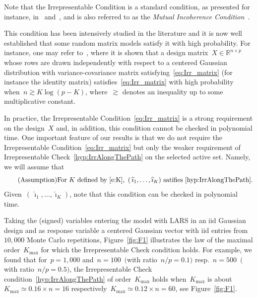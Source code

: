 \documentclass[final,numbib]{imaiai}%
\numberwithin{equation}{section}
\def\bbR{\mathds{R}}
\renewcommand{\hat}{\widehat}
\newcommand{\<}{\langle}
\renewcommand{\>}{\rangle}
\newcommand{\1}{\mathds{1}}
\begin{document}
{\begin{remark}
Note that the Irrepresentable Condition is a standard condition, as presented for instance, in~\cite[Page 53]{van2016estimation} and~\cite[Sec.~7.5.1]{Buhlmann_vandeGeer11}, and is also referred to as the {\it Mutual Incoherence Condition}~\citep{wainwright2009sharp}.
\end{remark}

\begin{remark}
This condition has been intensively studied in the literature and it is now well established that some random matrix models satisfy it with high probability.
For instance, one may refer to~\cite{wainwright2009sharp}, where it is shown that a design matrix~$X\in\bbR^{n\times p}$ whose rows are drawn independently with respect to a centered Gaussian distribution with variance-covariance matrix satisfying~\eqref{eq:Irr_matrix} (for instance the identity matrix) satisfies~\eqref{eq:Irr_matrix} with high probability when~$n\gtrsim K\log(p-K)$, where~$ \gtrsim$ denotes an inequality up to some multiplicative constant.
\end{remark}

In practice, the Irrepresentable Condition~\eqref{eq:Irr_matrix} is a strong requirement on the design~$X$ and, in addition, this condition cannot be checked in polynomial time.
One important feature of our results is that we do not require the Irrepresentable Condition~\eqref{eq:Irr_matrix} but only the weaker requirement of Irrepresentable Check~\eqref{hyp:IrrAlongThePath} on the selected active set.
Namely, we will assume that
\[
\tag{Assumption}
\text{For } K \text{ defined by }\eqref{e:K},\text{ }
(\,\hat \imath_1,\ldots,  \hat \imath_K)\text{ satifies }\eqref{hyp:IrrAlongThePath}.
\]
Given~$(\,\hat \imath_1,\ldots,  \hat \imath_K)$, note that this condition can be checked in polynomial time.

\begin{example}
Taking the (signed) variables entering the model with LARS in an iid Gaussian design and as response variable a centered Gaussian vector with iid entries from~$10,000$ Monte Carlo repetitions, Figure~\ref{fig:F1} illustrates the law of the maximal order~$K_{\mathrm{max}}$ for which the Irrepresentable Check condition holds.
For example, we found that for~$p=1,000$ and~$n=100$~$($with ratio~$n/p=0.1)$ resp.~$n=500$~$($with ratio~$n/p=0.5)$, the Irrepresentable Check condition~\eqref{hyp:IrrAlongThePath} of order~$K_{\mathrm{max}}$ holds when~$K_{\mathrm{max}}$ is about~$K_{\mathrm{max}}\simeq 0.16\times n=16$ respectively~$K_{\mathrm{max}}\simeq 0.12\times n=60$, see Figure~\ref{fig:F1}.
\end{example}

}
\end{document}
